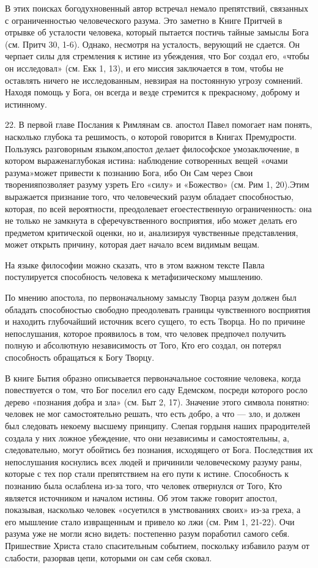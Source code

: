 \documentclass[a5paper,10pt]{article}
\begin{document}
В этих поисках богодухновенный автор встречал немало препятствий, связанных с
ограниченностью человеческого разума. Это заметно в Книге Притчей в отрывке об
усталости человека, который пытается постичь тайные замыслы Бога (см. Притч 30,
1-6). Однако, несмотря на усталость, верующий не сдается. Он черпает силы для
стремления к истине из убеждения, что Бог создал его, «чтобы он исследовал»
(см. Екк 1, 13), и его миссия заключается в том, чтобы не оставлять ничего не
исследованным, невзирая на постоянную угрозу сомнений. Находя помощь у Бога, он
всегда и везде стремится к прекрасному, доброму и истинному.

22. В первой главе Послания к Римлянам св. апостол Павел помогает нам понять,
насколько глубока та решимость, о которой говорится в Книгах Премудрости.
Пользуясь разговорным языком,апостол делает философское умозаключение, в
котором выраженаглубокая истина: наблюдение сотворенных вещей «очами
разума»может привести к познанию Бога, ибо Он Сам через Свои творенияпозволяет
разуму узреть Его «силу» и «Божество» (см. Рим 1, 20).Этим выражается признание
того, что человеческий разум обладает способностью, которая, по всей
вероятности, преодолевает егоестественную ограниченность: она не только не
замкнута в сферечувственного восприятия, ибо может делать его предметом
критической оценки, но и, анализируя чувственные представления, может открыть
причину, которая дает начало всем видимым вещам.

На языке философии можно сказать, что в этом важном тексте Павла постулируется
способность человека к метафизическому мышлению.

По мнению апостола, по первоначальному замыслу Творца разум должен был обладать
способностью свободно преодолевать границы чувственного восприятия и находить
глубочайший источник всего сущего, то есть Творца. Но по причине непослушания,
которое проявилось в том, что человек предпочел получить полную и абсолютную
независимость от Того, Кто его создал, он потерял способность обращаться к Богу
Творцу.

В книге Бытия образно описывается первоначальное состояние человека, когда
повествуется о том, что Бог поселил его саду Едемском, посреди которого росло
дерево «познания добра и зла» (см. Быт 2, 17). Значение этого символа понятно:
человек не мог самостоятельно решать, что есть добро, а что — зло, и должен был
следовать некоему высшему принципу. Слепая гордыня наших прародителей создала у
них ложное убеждение, что они независимы и самостоятельны, а, следовательно,
могут обойтись без познания, исходящего от Бога. Последствия их непослушания
коснулись всех людей и причинили человеческому разуму раны, которые с тех пор
стали препятствием на его пути к истине. Способность к познанию была ослаблена
из-за того, что человек отвернулся от Того, Кто является источником и началом
истины. Об этом также говорит апостол, показывая, насколько человек «осуетился
в умствованиях своих» из-за греха, а его мышление стало извращенным и привело
ко лжи (см. Рим 1, 21-22). Очи разума уже не могли ясно видеть: постепенно
разум поработил самого себя. Пришествие Христа стало спасительным событием,
поскольку избавило разум от слабости, разорвав цепи, которыми он сам себя
сковал.
\end{document}

